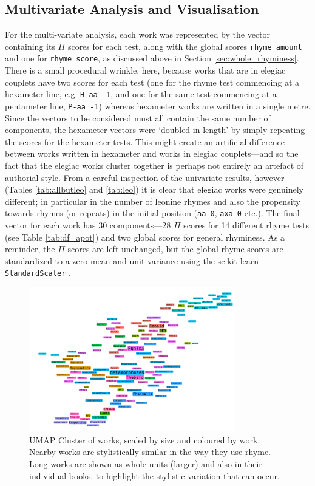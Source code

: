 \documentclass[twocolumn, switch]{article} %
\begin{document}
\subsection{Multivariate Analysis and Visualisation}

For the multi-variate analysis, each work was represented by the vector
containing its $\Pi$ scores for each test, along with the global scores
\texttt{rhyme amount} and one for \texttt{rhyme score}, as discussed above in
Section \ref{sec:whole_rhyminess}. There is a small procedural wrinkle, here,
because works that are in elegiac couplets have two scores for each test (one
for the rhyme test commencing at a hexameter line, e.g. \texttt{H-aa -1}, and
one for the same test commencing at a pentameter line, \texttt{P-aa -1})
whereas hexameter works are written in a single metre. Since the vectors to be
considered must all contain the same number of components, the hexameter
vectors were `doubled in length' by simply repeating the scores for the
hexameter tests. This might create an artificial difference between works
written in hexameter and works in elegiac couplets---and so the fact that the
elegiac works cluster together is perhaps not entirely an artefact of
authorial style. From a careful inspection of the univariate results, however
(Tables \ref{tab:allbutleo} and \ref{tab:leo}) it is clear that elegiac works
were genuinely different; in particular in the number of leonine rhymes and
also the propensity towards rhymes (or repeats) in the initial position
(\texttt{aa 0}, \texttt{axa 0} etc.). The final vector for each work has 30
components---28 $\Pi$ scores for 14 different rhyme tests (see Table
\ref{tab:df_apot}) and two global scores for general rhyminess. As a reminder,
the $\Pi$ scores are left unchanged, but the global rhyme scores are
standardized to a zero mean and unit variance using the scikit-learn
\texttt{StandardScaler} \cite{scikit-learn}.

\begin{figure}[ht]
\caption{
  UMAP Cluster of works, scaled by size and coloured by work. Nearby works are
  stylistically similar in the way they use rhyme. Long works are shown as
  whole units (larger) and also in their individual books, to highlight the
  stylistic variation that can occur.
}
\label{fig:rhymecloud}
\centering
\includegraphics[width=0.8\textwidth]{rhyme_umap.pdf}
\end{figure}
\end{document}
